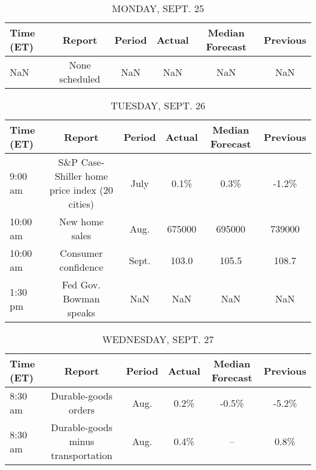 \documentclass{article}%
\begin{document}
%
\normalsize%


\begin{table}[htbp]%
\caption{MONDAY, SEPT. 25}%
\centering%
\begin{adjustbox}{width=1\textwidth}%
\begin{tabular}{lccccc}
\toprule
Time (ET) &         Report & Period & Actual & Median Forecast & Previous \\
\midrule
      NaN & None scheduled &    NaN &    NaN &             NaN &      NaN \\
\bottomrule
\end{tabular}
%
\end{adjustbox}%
\end{table}

%


\begin{table}[htbp]%
\caption{TUESDAY, SEPT. 26}%
\centering%
\begin{adjustbox}{width=1\textwidth}%
\begin{tabular}{lccccc}
\toprule
Time (ET) &                                        Report & Period & Actual & Median Forecast & Previous \\
\midrule
  9:00 am & S\&P Case-Shiller home price index (20 cities) &   July &   0.1\% &            0.3\% &    -1.2\% \\
 10:00 am &                                New home sales &   Aug. & 675000 &          695000 &   739000 \\
 10:00 am &                           Consumer confidence &  Sept. &  103.0 &           105.5 &    108.7 \\
  1:30 pm &                        Fed Gov. Bowman speaks &    NaN &    NaN &             NaN &      NaN \\
\bottomrule
\end{tabular}
%
\end{adjustbox}%
\end{table}

%


\begin{table}[htbp]%
\caption{WEDNESDAY, SEPT. 27}%
\centering%
\begin{adjustbox}{width=1\textwidth}%
\begin{tabular}{lccccc}
\toprule
Time (ET) &                             Report & Period & Actual & Median Forecast & Previous \\
\midrule
  8:30 am &               Durable-goods orders &   Aug. &   0.2\% &           -0.5\% &    -5.2\% \\
  8:30 am & Durable-goods minus transportation &   Aug. &   0.4\% &              -- &     0.8\% \\
\bottomrule
\end{tabular}
%
\end{adjustbox}%
\end{table}
\end{document}
